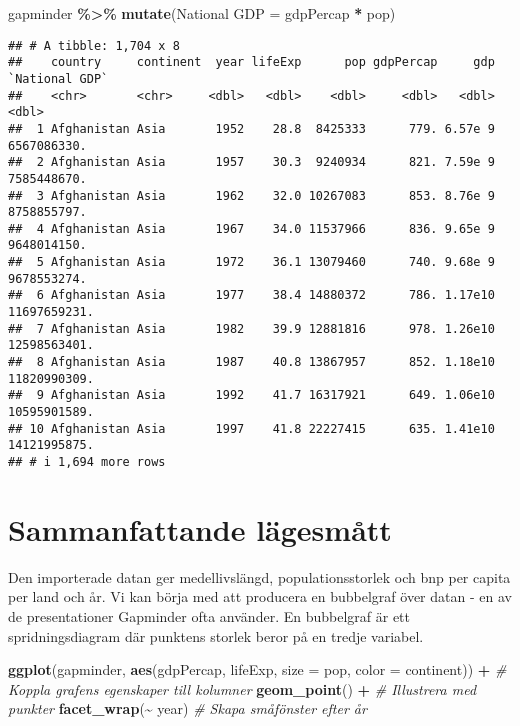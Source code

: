 \documentclass[
]{book}
\newenvironment{Shaded}{\begin{snugshade}}{\end{snugshade}}
\newcommand{\AttributeTok}[1]{\textcolor[rgb]{0.13,0.29,0.53}{#1}}
\newcommand{\CommentTok}[1]{\textcolor[rgb]{0.56,0.35,0.01}{\textit{#1}}}
\newcommand{\FunctionTok}[1]{\textcolor[rgb]{0.13,0.29,0.53}{\textbf{#1}}}
\newcommand{\NormalTok}[1]{#1}
\newcommand{\OtherTok}[1]{\textcolor[rgb]{0.56,0.35,0.01}{#1}}
\newcommand{\SpecialCharTok}[1]{\textcolor[rgb]{0.81,0.36,0.00}{\textbf{#1}}}
\newcommand{\StringTok}[1]{\textcolor[rgb]{0.31,0.60,0.02}{#1}}
\theoremstyle{definition}
\theoremstyle{definition}
\theoremstyle{definition}
\theoremstyle{definition}
\theoremstyle{remark}
\begin{document}
\begin{Shaded}
\begin{Highlighting}[]
\NormalTok{gapminder }\SpecialCharTok{\%\textgreater{}\%} 
  \FunctionTok{mutate}\NormalTok{(}\StringTok{\textasciigrave{}}\AttributeTok{National GDP}\StringTok{\textasciigrave{}} \OtherTok{=}\NormalTok{ gdpPercap }\SpecialCharTok{*}\NormalTok{ pop)}
\end{Highlighting}
\end{Shaded}

\begin{verbatim}
## # A tibble: 1,704 x 8
##    country     continent  year lifeExp      pop gdpPercap     gdp `National GDP`
##    <chr>       <chr>     <dbl>   <dbl>    <dbl>     <dbl>   <dbl>          <dbl>
##  1 Afghanistan Asia       1952    28.8  8425333      779. 6.57e 9    6567086330.
##  2 Afghanistan Asia       1957    30.3  9240934      821. 7.59e 9    7585448670.
##  3 Afghanistan Asia       1962    32.0 10267083      853. 8.76e 9    8758855797.
##  4 Afghanistan Asia       1967    34.0 11537966      836. 9.65e 9    9648014150.
##  5 Afghanistan Asia       1972    36.1 13079460      740. 9.68e 9    9678553274.
##  6 Afghanistan Asia       1977    38.4 14880372      786. 1.17e10   11697659231.
##  7 Afghanistan Asia       1982    39.9 12881816      978. 1.26e10   12598563401.
##  8 Afghanistan Asia       1987    40.8 13867957      852. 1.18e10   11820990309.
##  9 Afghanistan Asia       1992    41.7 16317921      649. 1.06e10   10595901589.
## 10 Afghanistan Asia       1997    41.8 22227415      635. 1.41e10   14121995875.
## # i 1,694 more rows
\end{verbatim}

\hypertarget{sammanfattande-luxe4gesmuxe5tt}{%
\section{Sammanfattande lägesmått}\label{sammanfattande-luxe4gesmuxe5tt}}

Den importerade datan ger medellivslängd, populationsstorlek och bnp per capita per land och år. Vi kan börja med att producera en bubbelgraf över datan - en av de presentationer Gapminder ofta använder. En bubbelgraf är ett spridningsdiagram där punktens storlek beror på en tredje variabel.

\begin{Shaded}
\begin{Highlighting}[]
\FunctionTok{ggplot}\NormalTok{(gapminder, }\FunctionTok{aes}\NormalTok{(gdpPercap, lifeExp, }\AttributeTok{size =}\NormalTok{ pop, }\AttributeTok{color =}\NormalTok{ continent)) }\SpecialCharTok{+}    \CommentTok{\# Koppla grafens egenskaper till kolumner}
  \FunctionTok{geom\_point}\NormalTok{() }\SpecialCharTok{+}                                                               \CommentTok{\# Illustrera med punkter}
  \FunctionTok{facet\_wrap}\NormalTok{(}\SpecialCharTok{\textasciitilde{}}\NormalTok{ year)                                                           }\CommentTok{\# Skapa småfönster efter år}
\end{Highlighting}
\end{Shaded}
\end{document}
